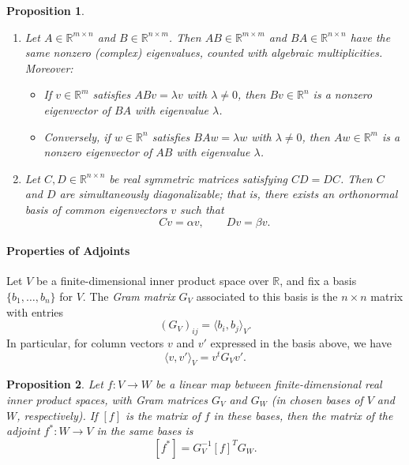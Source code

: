 \documentclass{article}
\newtheorem{proposition}{Proposition}[section]
\begin{document}
\begin{proposition}
    \label{prop:laplaceusefulLA}
\leavevmode
\begin{enumerate}
    \item Let $A \in \mathbb{R}^{m \times n}$ and $B \in \mathbb{R}^{n \times m}$. Then $AB \in \mathbb{R}^{m \times m}$ and $BA \in \mathbb{R}^{n \times n}$ have the same nonzero (complex) eigenvalues, counted with algebraic multiplicities. Moreover:
    \begin{itemize}
        \item If $v \in \mathbb{R}^m$ satisfies $AB v = \lambda v$ with $\lambda \neq 0$, then $Bv \in \mathbb{R}^n$ is a nonzero eigenvector of $BA$ with eigenvalue $\lambda$.
        \item Conversely, if $w \in \mathbb{R}^n$ satisfies $BA w = \lambda w$ with $\lambda \neq 0$, then $Aw \in \mathbb{R}^m$ is a nonzero eigenvector of $AB$ with eigenvalue $\lambda$.
    \end{itemize}

    \item Let $C, D \in \mathbb{R}^{n \times n}$ be real symmetric matrices satisfying $CD = DC$. Then $C$ and $D$ are simultaneously diagonalizable; that is, there exists an orthonormal basis of common eigenvectors $v$ such that
    \[
    Cv = \alpha v, \qquad Dv = \beta v.
    \]
\end{enumerate}
\end{proposition}

\paragraph{Properties of Adjoints}
Let $V$ be a finite-dimensional inner product space over $ \mathbb{R}$, and fix a basis $\{b_1, \dots, b_n\}$ for $V$. The \emph{Gram matrix} $G_V$ associated to this basis is the $n \times n$ matrix with entries
\[
(G_V)_{ij} = \langle b_i, b_j \rangle_V.
\]
In particular, for column vectors $v$ and $v'$ expressed in the basis above, we have 
\[\langle v, v'\rangle_V = v^tG_Vv'.\]

\begin{proposition}
    \label{prop:matrixformadjoint}
Let $f \colon V \to W$ be a linear map between finite-dimensional real inner product spaces, with Gram matrices $G_V$ and $G_W$ (in chosen bases of $V$ and $W$, respectively). If $[f]$ is the matrix of $f$ in these bases, then the matrix of the adjoint $f^* \colon W \to V$ in the same bases is
\[
[f^*] = G_V^{-1} [f]^T G_W.
\]
\end{proposition}
\end{document}

